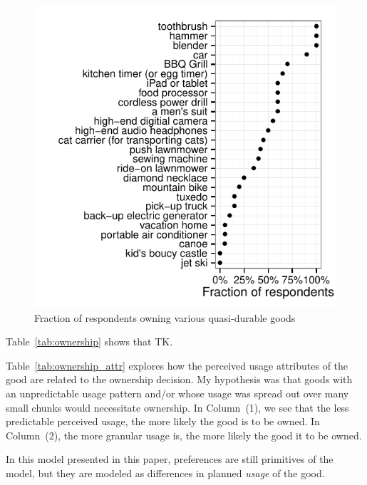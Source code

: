 \documentclass[11pt]{article}
\begin{document}
\begin{figure}
\centering 
\caption{Fraction of respondents owning various quasi-durable goods}
\begin{minipage}{0.90 \linewidth}
\includegraphics[width = \linewidth]{./plots/ownership_fractions.pdf} 
\end{minipage} 
\end{figure} 

Table~\ref{tab:ownership} shows that TK. 



Table~\ref{tab:ownership_attr} explores how the perceived usage attributes of the good are related to the ownership decision.
My hypothesis was that goods with an unpredictable usage pattern and/or whose usage was spread out over many small chunks would necessitate ownership. 
In Column~(1), we see that the less predictable perceived usage, the more likely the good is to be owned. 
In Column~(2), the more granular usage is, the more likely the good it to be owned. 

 

In this model presented in this paper, preferences are still primitives of the model, but they are modeled as differences in planned \emph{usage} of the good.  

\cite{kuziemko2013elastic} 
\end{document}

